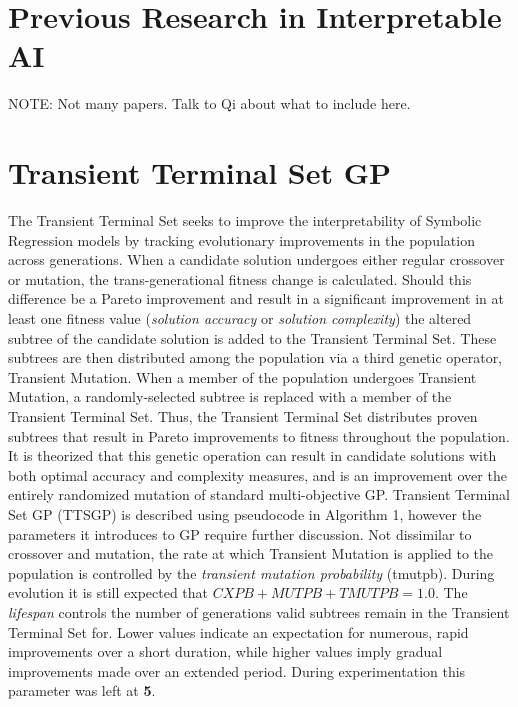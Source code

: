 \documentclass[a4paper, twocolumn]{article}
\begin{document}
\section{Previous Research in Interpretable AI}
NOTE: Not many papers. Talk to Qi about what to include here.

\section{Transient Terminal Set GP}
The Transient Terminal Set seeks to improve the interpretability of Symbolic Regression models by tracking evolutionary improvements in the population across generations. When a candidate solution undergoes either regular crossover or mutation, the trans-generational fitness change is calculated. Should this difference be a Pareto improvement and result in a significant improvement in at least one fitness value (\textit{solution accuracy} or \textit{solution complexity}) the altered subtree of the candidate solution is added to the Transient Terminal Set.
\newline
These subtrees are then distributed among the population via a third genetic operator, Transient Mutation. When a member of the population undergoes Transient Mutation, a randomly-selected subtree is replaced with a member of the Transient Terminal Set. Thus, the Transient Terminal Set distributes proven subtrees that result in Pareto improvements to fitness throughout the population. It is theorized that this genetic operation can result in candidate solutions with both optimal accuracy and complexity measures, and is an improvement over the entirely randomized mutation of standard multi-objective GP. 
\newline
Transient Terminal Set GP (TTSGP) is described using pseudocode in Algorithm 1, however the parameters it introduces to GP require further discussion.
\newline 
Not dissimilar to crossover and mutation, the rate at which Transient Mutation is applied to the population is controlled by the \textit{transient mutation probability} (tmutpb). During evolution it is still expected that $CXPB + MUTPB + TMUTPB = 1.0$.
\newline
The \textit{lifespan} controls the number of generations valid subtrees remain in the Transient Terminal Set for. Lower values indicate an expectation for numerous, rapid improvements over a short duration, while higher values imply gradual improvements made over an extended period. During experimentation this parameter was left at \textbf{5}.
\end{document}
